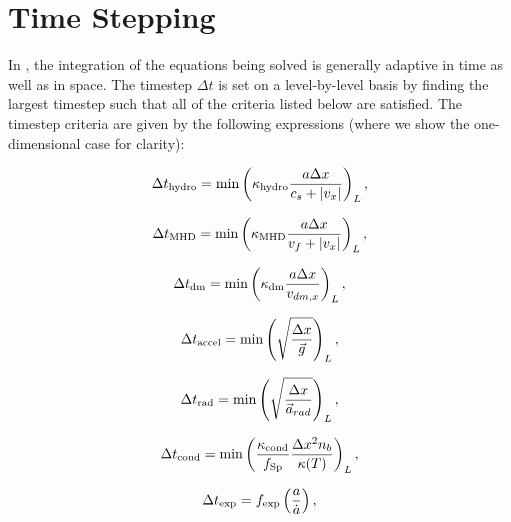 \section{Time Stepping}
\label{sec.timestepping}

In \enzo, the integration of the equations being solved is generally adaptive in time 
as well as in space.  The timestep $\Delta t$ is set on a level-by-level
basis by finding the largest timestep such that all of the criteria listed below are
satisfied.  The timestep criteria are given by the following expressions
(where we show the one-dimensional case for clarity):

\begin{equation}
\Delta t_{\rm hydro} = \min \left( \kappa_{\rm hydro} \frac{a \Delta x}{c_{s} + |v_x|} \right)_L ,
\label{eqn:dthydro}
\end{equation}

\begin{equation}
\Delta t_{\rm MHD} = \min \left( \kappa_{\rm MHD} \frac{a \Delta x}{v_{f} + |v_x|} \right)_L ,
\label{eqn:dtMHD}
\end{equation}

\begin{equation}
\Delta t_{\rm dm} = \min \left(\kappa_{\rm dm} \frac{a \Delta x}{v_{dm,x}} \right)_L ,
\label{eqn:dtdarkmatter}
\end{equation}

\begin{equation}
\Delta t_{\rm accel} = \min \left( \sqrt{\frac{\Delta x}{\vec{g}}} \right)_L ,
\label{eqn:dtaccel}
\end{equation}

\begin{equation}
\Delta t_{\rm rad} = \min \left(  \sqrt{\frac{\Delta x}{\vec{a}_{rad}}} \right)_L,
\label{eqn:dtrad}
\end{equation}

\begin{equation}
\Delta t_{\rm cond} = \min \left(  \frac{ \kappa_{\rm cond}}{f_{\rm Sp}} \frac{\Delta x^2
    n_b}{\kappa(T)} \right)_L,
\label{eqn:dtcond}
\end{equation}

\begin{equation}
\Delta t_{\rm exp} = f_{\rm exp} \left( \frac{a}{\dot{a}} \right) ,
\label{eqn:dtexpand}
\end{equation}



